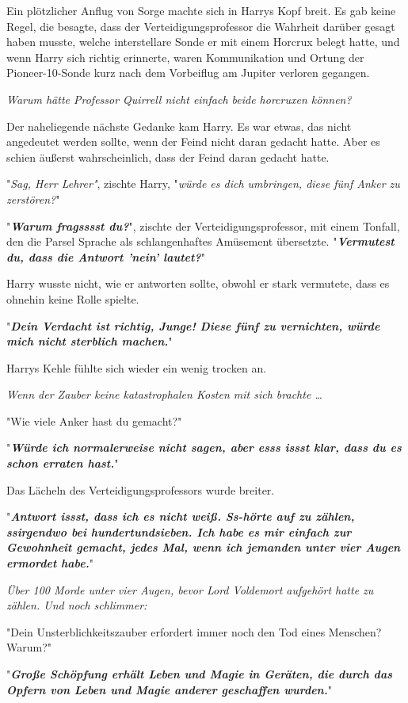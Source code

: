 {Ein plötzlicher Anflug von Sorge machte sich in Harrys Kopf breit. Es gab keine Regel, die besagte, dass der Verteidigungsprofessor die Wahrheit darüber gesagt haben musste, welche interstellare Sonde er mit einem Horcrux belegt hatte, und wenn Harry sich richtig erinnerte, waren Kommunikation und Ortung der Pioneer-10-Sonde kurz nach dem Vorbeiflug am Jupiter verloren gegangen.

\emph{Warum hätte Professor Quirrell nicht einfach beide horcruxen können?}

Der naheliegende nächste Gedanke kam Harry. Es war etwas, das nicht angedeutet werden sollte, wenn der Feind nicht daran gedacht hatte. Aber es schien äußerst wahrscheinlich, dass der Feind daran gedacht hatte.

"\emph{Sag, Herr Lehrer"}, zischte Harry, "\emph{würde es dich umbringen, diese fünf Anker zu zerstören?}"

"\textbf{\emph{Warum fragsssst du?}}", zischte der Verteidigungsprofessor, mit einem Tonfall, den die Parsel Sprache als schlangenhaftes Amüsement übersetzte. "\textbf{\emph{Vermutest du, dass die Antwort 'nein' lautet?}}"

Harry wusste nicht, wie er antworten sollte, obwohl er stark vermutete, dass es ohnehin keine Rolle spielte.

"\textbf{\emph{Dein Verdacht ist richtig, Junge! Diese fünf zu vernichten, würde mich nicht sterblich machen.}}"

Harrys Kehle fühlte sich wieder ein wenig trocken an.

\emph{Wenn der Zauber keine katastrophalen Kosten mit sich brachte …}

"Wie viele Anker hast du gemacht?"

"\textbf{\emph{Würde ich normalerweise nicht sagen, aber esss issst klar, dass du es schon erraten hast.}}"

Das Lächeln des Verteidigungsprofessors wurde breiter.

"\textbf{\emph{Antwort issst, dass ich es nicht weiß. Ss-hörte auf zu zählen, ssirgendwo bei hundertundsieben. Ich habe es mir einfach zur Gewohnheit gemacht, jedes Mal, wenn ich jemanden unter vier Augen ermordet habe.}}"

\emph{Über 100 Morde unter vier Augen, bevor Lord Voldemort aufgehört hatte zu zählen. Und noch schlimmer:}

"Dein Unsterblichkeitszauber erfordert immer noch den Tod eines Menschen? Warum?"

"\textbf{\emph{Große Schöpfung erhält Leben und Magie in Geräten, die durch das Opfern von Leben und Magie anderer geschaffen wurden.}}"

}
